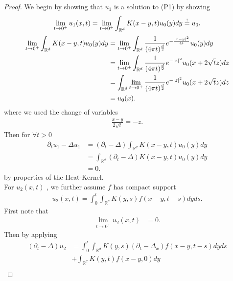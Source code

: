 \begin{proof}
  We begin by showing that $u_{1}$ is a solution to (P1) by showing
  \begin{align*}
    \lim_{t \to 0^{+}}  u_{1}(x,t) = \lim_{t \to 0^{+}} \int_{\mathbb{R}^{d} }K(x-y,t)u_0(y) dy \myS{!}{=} u_{0}
  .\end{align*}
  \begin{align*}
    \lim_{t \to 0^{+} }\int_{\mathbb{R}^{d} }K(x-y,t)u_0(y) dy &= \lim_{t \to 0^{+} } \int_{\mathbb{R}^{d} } \frac{1}{(4\pi t)^{\frac{d}{2}}} e^{-\frac{\abs{x-y}^2}{4t}} u_0(y) dy \\ 
                                           &=  \lim_{t \to 0^{+} } \int_{\mathbb{R}^{d} } \frac{1}{(4\pi t)^{\frac{d}{2}} } e^{-\abs{z}^2}  u_{0}(x+2 \sqrt{t} z ) dz \\
                                           &= \int_{\mathbb{R}^{d}  } \lim_{t \to 0^{+} } \frac{1}{(4\pi t)^{\frac{d}{2}} } e^{-\abs{z}^2}  u_{0}(x+2 \sqrt{t} z ) dz \\
                                           &= u_0(x)  
  .\end{align*}
  where we used the change of variables 
  \begin{align*}
    \frac{x-y}{2 \sqrt{t} }= -z
  .\end{align*}
  Then  for $\forall  t > 0$
  \begin{align*}
    \partial_t u_{1} - \Delta u_{1} &= (\partial_t -  \Delta) \int_{\mathbb{R}^{d} } K(x-y,t)u_0(y)dy\\
                                    &= \int_{\mathbb{R}^{d} } (\partial_t - \Delta )K(x-y,t) u_0(y) dy \\
                                    &= 0
  .\end{align*}
  by properties of the Heat-Kernel. \\[1ex]
  For $u_{2}(x,t)$ , we further assume $f$ has compact support
  \begin{align*}
    u_{2}(x,t)  = \int_0^{t}  \int_{\mathbb{R}^{d} }K(y,s)f(x-y,t-s) dy ds
  .\end{align*}
  First note that  
  \begin{align*}
    \lim_{t \to 0^{+}}  u_{2}(x,t) &= 0 
  .\end{align*}
  Then by applying 
  \begin{align*}
    (\partial_t - \Delta )u_{2}  &= \int_0^{t} \int_{\mathbb{R}^{d} } K(y,s)(\partial_t - \Delta_x)f(x-y,t-s) dy ds \\
                                 &+ \int_{\mathbb{R}^{d} } K(y,t)f(x-y,0) dy\\

\end{align*}
\end{proof}

